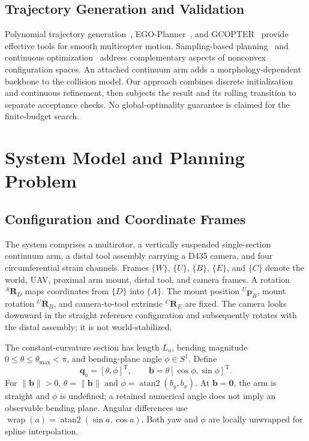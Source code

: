 \documentclass[journal,twoside]{IEEEtran}
\newcommand{\wrap}{\operatorname{wrap}}
\begin{document}
\subsection{Trajectory Generation and Validation}
Polynomial trajectory generation~\cite{mellinger2011minsnap}, EGO-Planner~\cite{zhou2021egoplanner}, and GCOPTER~\cite{wang2022gcopter} provide effective tools for smooth multicopter motion. Sampling-based planning~\cite{karaman2011sampling,meng2022rrtstar} and continuous optimization~\cite{schulman2014trajopt} address complementary aspects of nonconvex configuration spaces. An attached continuum arm adds a morphology-dependent backbone to the collision model. Our approach combines discrete initialization and continuous refinement, then subjects the result and its rolling transition to separate acceptance checks. No global-optimality guarantee is claimed for the finite-budget search.

\section{System Model and Planning Problem}\label{sec:model}


\subsection{Configuration and Coordinate Frames}
The system comprises a multirotor, a vertically suspended single-section continuum arm, a distal tool assembly carrying a D435 camera, and four circumferential strain channels. Frames $\{W\}$, $\{U\}$, $\{B\}$, $\{E\}$, and $\{C\}$ denote the world, UAV, proximal arm mount, distal tool, and camera frames. A rotation ${}^{A}\mathbf R_D$ maps coordinates from $\{D\}$ into $\{A\}$. The mount position ${}^{U}\mathbf p_B$, mount rotation ${}^{U}\mathbf R_B$, and camera-to-tool extrinsic ${}^{C}\mathbf R_E$ are fixed. The camera looks downward in the straight reference configuration and subsequently rotates with the distal assembly; it is not world-stabilized.

The constant-curvature section has length $L_a$, bending magnitude $0\le\theta\le\theta_{\max}<\pi$, and bending-plane angle $\phi\in S^1$. Define
\begin{equation}
\mathbf q_a=[\theta,\phi]^{\mathrm T},\qquad
\mathbf b=\theta[\cos\phi,\sin\phi]^{\mathrm T}.
\label{eq:morphology_state}
\end{equation}
For $\|\mathbf b\|>0$, $\theta=\|\mathbf b\|$ and $\phi=\operatorname{atan2}(b_y,b_x)$. At $\mathbf b=\mathbf0$, the arm is straight and $\phi$ is undefined; a retained numerical angle does not imply an observable bending plane. Angular differences use $\wrap(a)=\operatorname{atan2}(\sin a,\cos a)$. Both yaw and $\phi$ are locally unwrapped for spline interpolation.
\end{document}
